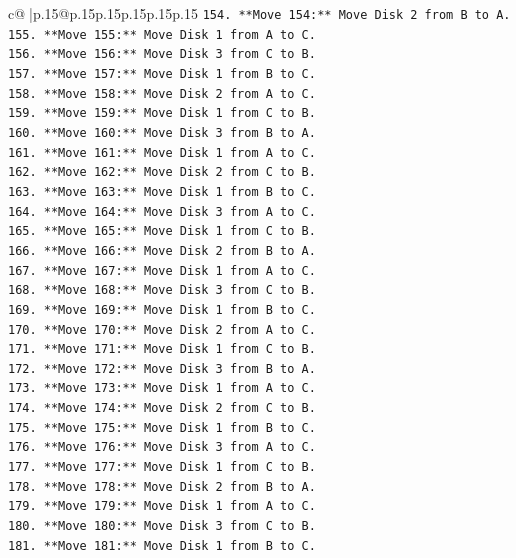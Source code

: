 \documentclass{article}
\begin{document}
{\begin{supertabular}{c@{$\;$}|p{.15\linewidth}@{}p{.15\linewidth}p{.15\linewidth}p{.15\linewidth}p{.15\linewidth}p{.15\linewidth}}
{{{\texttt{154. **Move 154:** Move Disk 2 from B to A.} \\
\texttt{155. **Move 155:** Move Disk 1 from A to C.} \\
\texttt{156. **Move 156:** Move Disk 3 from C to B.} \\
\texttt{157. **Move 157:** Move Disk 1 from B to C.} \\
\texttt{158. **Move 158:** Move Disk 2 from A to C.} \\
\texttt{159. **Move 159:** Move Disk 1 from C to B.} \\
\texttt{160. **Move 160:** Move Disk 3 from B to A.} \\
\texttt{161. **Move 161:** Move Disk 1 from A to C.} \\
\texttt{162. **Move 162:** Move Disk 2 from C to B.} \\
\texttt{163. **Move 163:** Move Disk 1 from B to C.} \\
\texttt{164. **Move 164:** Move Disk 3 from A to C.} \\
\texttt{165. **Move 165:** Move Disk 1 from C to B.} \\
\texttt{166. **Move 166:** Move Disk 2 from B to A.} \\
\texttt{167. **Move 167:** Move Disk 1 from A to C.} \\
\texttt{168. **Move 168:** Move Disk 3 from C to B.} \\
\texttt{169. **Move 169:** Move Disk 1 from B to C.} \\
\texttt{170. **Move 170:** Move Disk 2 from A to C.} \\
\texttt{171. **Move 171:** Move Disk 1 from C to B.} \\
\texttt{172. **Move 172:** Move Disk 3 from B to A.} \\
\texttt{173. **Move 173:** Move Disk 1 from A to C.} \\
\texttt{174. **Move 174:** Move Disk 2 from C to B.} \\
\texttt{175. **Move 175:** Move Disk 1 from B to C.} \\
\texttt{176. **Move 176:** Move Disk 3 from A to C.} \\
\texttt{177. **Move 177:** Move Disk 1 from C to B.} \\
\texttt{178. **Move 178:** Move Disk 2 from B to A.} \\
\texttt{179. **Move 179:** Move Disk 1 from A to C.} \\
\texttt{180. **Move 180:** Move Disk 3 from C to B.} \\
\texttt{181. **Move 181:** Move Disk 1 from B to C.} \\
}}}
\end{supertabular}}
\end{document}
